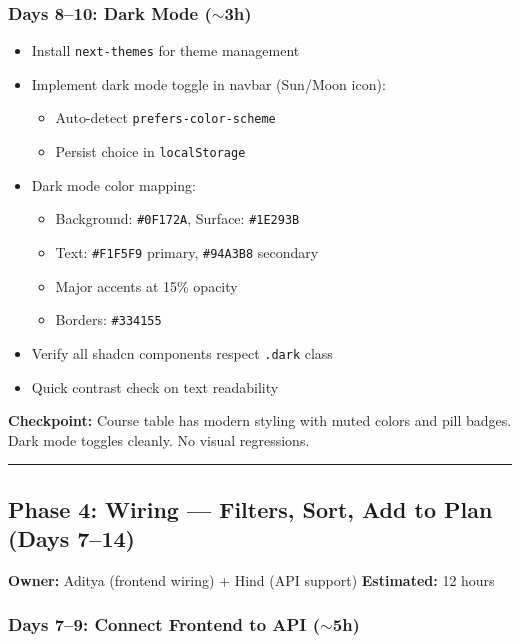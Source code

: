 \documentclass[11pt]{article}
\begin{document}
\subsubsection{Days 8--10: Dark Mode ($\sim$3h)}

\begin{itemize}[leftmargin=2em]
    \item Install \texttt{next-themes} for theme management
    \item Implement dark mode toggle in navbar (Sun/Moon icon):
    \begin{itemize}
        \item Auto-detect \texttt{prefers-color-scheme}
        \item Persist choice in \texttt{localStorage}
    \end{itemize}
    \item Dark mode color mapping:
    \begin{itemize}
        \item Background: \texttt{\#0F172A}, Surface: \texttt{\#1E293B}
        \item Text: \texttt{\#F1F5F9} primary, \texttt{\#94A3B8} secondary
        \item Major accents at 15\% opacity
        \item Borders: \texttt{\#334155}
    \end{itemize}
    \item Verify all shadcn components respect \texttt{.dark} class
    \item Quick contrast check on text readability
\end{itemize}

\noindent
\textbf{Checkpoint:} Course table has modern styling with muted colors and pill badges. Dark mode toggles cleanly. No visual regressions.

\noindent\rule{\textwidth}{0.2pt}

\subsection{Phase 4: Wiring — Filters, Sort, Add to Plan (Days 7--14)}

\textbf{Owner:} Aditya (frontend wiring) + Hind (API support) \hfill \textbf{Estimated:} 12 hours

\subsubsection{Days 7--9: Connect Frontend to API ($\sim$5h)}
\end{document}

